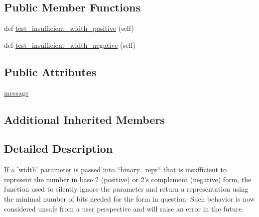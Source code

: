 \subsection*{Public Member Functions}
\begin{DoxyCompactItemize}
\item 
def \hyperlink{classnumpy_1_1core_1_1tests_1_1test__deprecations_1_1TestBinaryReprInsufficientWidthParameterForRepresentation_aeb07ee7674ecf20dec707a81efa700a1}{test\+\_\+insufficient\+\_\+width\+\_\+positive} (self)
\item 
def \hyperlink{classnumpy_1_1core_1_1tests_1_1test__deprecations_1_1TestBinaryReprInsufficientWidthParameterForRepresentation_ad3af7e643dd922a15a7fc3257ff605bc}{test\+\_\+insufficient\+\_\+width\+\_\+negative} (self)
\end{DoxyCompactItemize}
\subsection*{Public Attributes}
\begin{DoxyCompactItemize}
\item 
\hyperlink{classnumpy_1_1core_1_1tests_1_1test__deprecations_1_1TestBinaryReprInsufficientWidthParameterForRepresentation_a96a88a754f0db600c941a987f9ae0488}{message}
\end{DoxyCompactItemize}
\subsection*{Additional Inherited Members}


\subsection{Detailed Description}
\begin{DoxyVerb}If a 'width' parameter is passed into ``binary_repr`` that is insufficient to
represent the number in base 2 (positive) or 2's complement (negative) form,
the function used to silently ignore the parameter and return a representation
using the minimal number of bits needed for the form in question. Such behavior
is now considered unsafe from a user perspective and will raise an error in the future.
\end{DoxyVerb}
 

